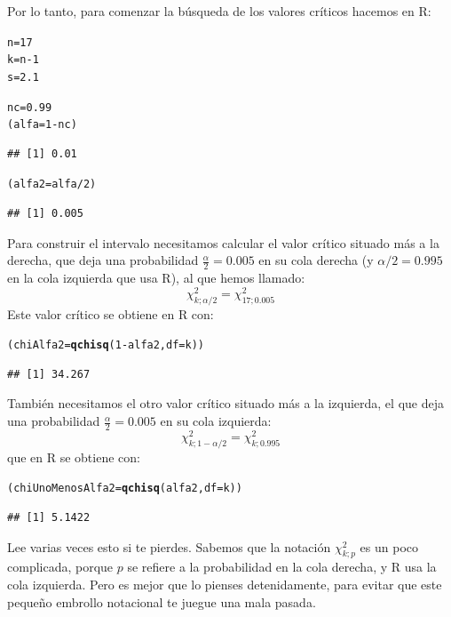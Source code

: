 \documentclass[10pt,a4paper]{article}\usepackage[]{graphicx}\usepackage[]{color}
\makeatletter
\newcommand{\hlnum}[1]{\textcolor[rgb]{0.686,0.059,0.569}{#1}}%
\newcommand{\hlopt}[1]{\textcolor[rgb]{0,0,0}{#1}}%
\newcommand{\hlstd}[1]{\textcolor[rgb]{0.345,0.345,0.345}{#1}}%
\newcommand{\hlkwb}[1]{\textcolor[rgb]{0.69,0.353,0.396}{#1}}%
\newcommand{\hlkwc}[1]{\textcolor[rgb]{0.333,0.667,0.333}{#1}}%
\newcommand{\hlkwd}[1]{\textcolor[rgb]{0.737,0.353,0.396}{\textbf{#1}}}%
\newenvironment{kframe}{%
 \def\at@end@of@kframe{}%
 \ifinner\ifhmode%
  \def\at@end@of@kframe{\end{minipage}}%
  \begin{minipage}{\columnwidth}%
 \fi\fi%
 \def\FrameCommand##1{\hskip\@totalleftmargin \hskip-\fboxsep
 \colorbox{shadecolor}{##1}\hskip-\fboxsep
     \hskip-\linewidth \hskip-\@totalleftmargin \hskip\columnwidth}%
 \MakeFramed {\advance\hsize-\width
   \@totalleftmargin\z@ \linewidth\hsize
   \@setminipage}}%
 {\par\unskip\endMakeFramed%
 \at@end@of@kframe}
\newenvironment{knitrout}{}{} %
\makeatother
\begin{document}
Por lo tanto, para comenzar la búsqueda de los valores críticos hacemos en R:
\begin{knitrout}
\color{fgcolor}\begin{kframe}
\begin{alltt}
\hlstd{n} \hlkwb{=} \hlnum{17}
\hlstd{k} \hlkwb{=} \hlstd{n} \hlopt{-} \hlnum{1}
\hlstd{s} \hlkwb{=} \hlnum{2.1}

\hlstd{nc} \hlkwb{=} \hlnum{0.99}
\hlstd{(alfa} \hlkwb{=} \hlnum{1} \hlopt{-} \hlstd{nc)}
\end{alltt}
\begin{verbatim}
## [1] 0.01
\end{verbatim}
\begin{alltt}
\hlstd{(alfa2} \hlkwb{=} \hlstd{alfa} \hlopt{/}\hlnum{2}\hlstd{)}
\end{alltt}
\begin{verbatim}
## [1] 0.005
\end{verbatim}
\end{kframe}
\end{knitrout}
Para  construir el intervalo necesitamos calcular el valor crítico situado más a la derecha, que deja una probabilidad $\frac{\alpha}{2}=0.005$ en su cola derecha (y $\alpha/2 = 0.995$ en la cola izquierda que usa R), al que hemos llamado:
\[\chi^2_{k;\alpha/2} = \chi^2_{17;0.005}\]
Este valor crítico se obtiene en R con:
\begin{knitrout}
\color{fgcolor}\begin{kframe}
\begin{alltt}
\hlstd{(chiAlfa2} \hlkwb{=} \hlkwd{qchisq}\hlstd{(}\hlnum{1} \hlopt{-} \hlstd{alfa2,} \hlkwc{df}\hlstd{=k))}
\end{alltt}
\begin{verbatim}
## [1] 34.267
\end{verbatim}
\end{kframe}
\end{knitrout}
También necesitamos el otro valor crítico situado más a la izquierda, el que deja una probabilidad $\frac{\alpha}{2}=0.005$ en su cola izquierda:
\[\chi^2_{k;1 - \alpha/2} = \chi^2_{k;0.995}\]
que en R se obtiene con:
\begin{knitrout}
\color{fgcolor}\begin{kframe}
\begin{alltt}
\hlstd{(chiUnoMenosAlfa2} \hlkwb{=} \hlkwd{qchisq}\hlstd{(alfa2,} \hlkwc{df}\hlstd{=k))}
\end{alltt}
\begin{verbatim}
## [1] 5.1422
\end{verbatim}
\end{kframe}
\end{knitrout}
Lee varias veces esto si te pierdes. Sabemos que la notación $\chi^2_{k;p}$ es un poco complicada, porque $p$ se refiere a la probabilidad en la cola derecha, y R usa la cola izquierda. Pero es mejor que lo pienses detenidamente, para evitar que este pequeño embrollo notacional te juegue una mala pasada.
\end{document}
